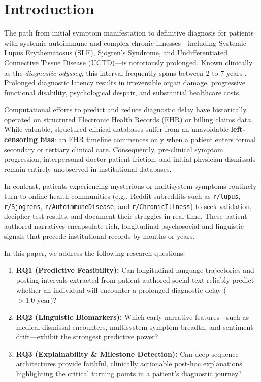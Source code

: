 \documentclass[runningheads]{llncs}
\begin{document}
\section{Introduction}
\label{sec:intro}

The path from initial symptom manifestation to definitive diagnosis for patients with systemic autoimmune and complex chronic illnesses—including Systemic Lupus Erythematosus (SLE), Sj\"ogren's Syndrome, and Undifferentiated Connective Tissue Disease (UCTD)—is notoriously prolonged. Known clinically as the \emph{diagnostic odyssey}, this interval frequently spans between 2 to 7 years \cite{franz2020diagnostic}. Prolonged diagnostic latency results in irreversible organ damage, progressive functional disability, psychological despair, and substantial healthcare costs.

Computational efforts to predict and reduce diagnostic delay have historically operated on structured Electronic Health Records (EHR) or billing claims data. While valuable, structured clinical databases suffer from an unavoidable \textbf{left-censoring bias}: an EHR timeline commences only when a patient enters formal secondary or tertiary clinical care. Consequently, pre-clinical symptom progression, interpersonal doctor-patient friction, and initial physician dismissals remain entirely unobserved in institutional databases.

In contrast, patients experiencing mysterious or multisystem symptoms routinely turn to online health communities (e.g., Reddit subreddits such as \texttt{r/lupus}, \texttt{r/Sjogrens}, \texttt{r/AutoimmuneDisease}, and \texttt{r/ChronicIllness}) to seek validation, decipher test results, and document their struggles in real time. These patient-authored narratives encapsulate rich, longitudinal psychosocial and linguistic signals that precede institutional records by months or years.

In this paper, we address the following research questions:
\begin{enumerate}
    \item \textbf{RQ1 (Predictive Feasibility):} Can longitudinal language trajectories and posting intervals extracted from patient-authored social text reliably predict whether an individual will encounter a prolonged diagnostic delay ($>1.0\text{ year}$)?
    \item \textbf{RQ2 (Linguistic Biomarkers):} Which early narrative features—such as medical dismissal encounters, multisystem symptom breadth, and sentiment drift—exhibit the strongest predictive power?
    \item \textbf{RQ3 (Explainability \& Milestone Detection):} Can deep sequence architectures provide faithful, clinically actionable post-hoc explanations highlighting the critical turning points in a patient's diagnostic journey?
\end{enumerate}
\end{document}
